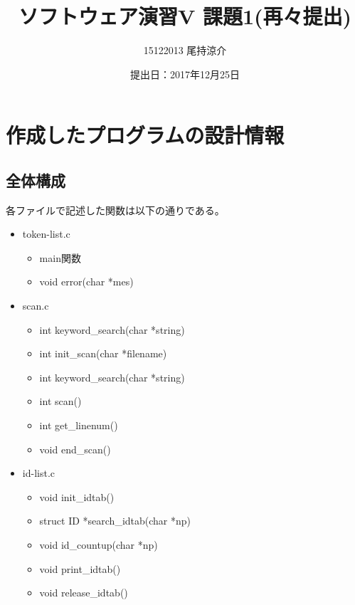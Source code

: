 \documentclass{jarticle}
\title{ソフトウェア演習V 課題1(再々提出)}
\author{15122013 尾持涼介}
\date{提出日：2017年12月25日}
\makeatletter
\def\maketitle{%
\null
\thispagestyle{empty}%
\vfill
\begin{center}\leavevmode
\normalfont
{\LARGE \@title\par}%
\vskip 1cm
{\Large \@author\par}%
\vskip 1cm
{\Large \@date\par}%
\end{center}%
\vfill
\null
\@thanks%
\cleardoublepage
}
\makeatother
\begin{document}
\maketitle

\section{作成したプログラムの設計情報}
\subsection{全体構成}
各ファイルで記述した関数は以下の通りである。
\begin{itemize}
  \item token-list.c
  \begin{itemize}
    \item main関数
    \item void error(char *mes)
  \end{itemize}
  \item scan.c
  \begin{itemize}
    \item int keyword\_search(char *string)
    \item int init\_scan(char *filename)
    \item int keyword\_search(char *string)
    \item int scan()
    \item int get\_linenum()
    \item void end\_scan()
  \end{itemize}
  \item id-list.c
  \begin{itemize}
    \item void init\_idtab()
    \item struct ID *search\_idtab(char *np)
    \item void id\_countup(char *np)
    \item void print\_idtab()
    \item void release\_idtab()
  \end{itemize}
\end{itemize}
\end{document}
